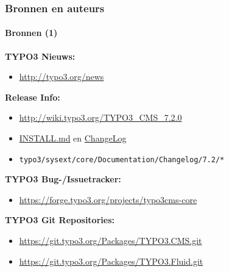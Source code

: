 \begin{frame}[fragile]
	\frametitle{Bronnen en auteurs}
	\framesubtitle{Bronnen (1)}

	\textbf{TYPO3 Nieuws:}
		\begin{itemize}\smaller
			\item \url{http://typo3.org/news}
		\end{itemize}

	\textbf{Release Info:}
		\begin{itemize}\smaller
			\item \url{http://wiki.typo3.org/TYPO3_CMS_7.2.0}
			\item \href{https://github.com/TYPO3/TYPO3.CMS/blob/master/INSTALL.md}{INSTALL.md} en \href{https://github.com/TYPO3/TYPO3.CMS/blob/master/ChangeLog}{ChangeLog}
			\item \texttt{typo3/sysext/core/Documentation/Changelog/7.2/*}
		\end{itemize}

	\textbf{TYPO3 Bug-/Issuetracker:}
		\begin{itemize}\smaller
			\item \url{https://forge.typo3.org/projects/typo3cms-core}
		\end{itemize}

	\textbf{TYPO3 Git Repositories:}
		\begin{itemize}\smaller
			\item \url{https://git.typo3.org/Packages/TYPO3.CMS.git}
			\item \url{https://git.typo3.org/Packages/TYPO3.Fluid.git}
		\end{itemize}

\end{frame}


